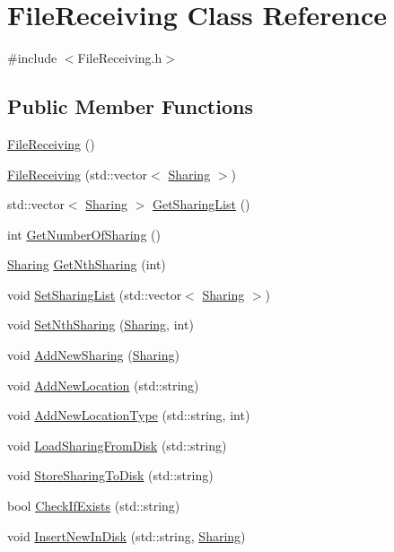 \hypertarget{classFileReceiving}{\section{File\-Receiving Class Reference}
\label{classFileReceiving}
}


{\ttfamily \#include $<$File\-Receiving.\-h$>$}

\subsection*{Public Member Functions}
\begin{DoxyCompactItemize}
\item 
\hyperlink{classFileReceiving_a210d62e5e2cb29bbd4b55127816f68bf}{File\-Receiving} ()
\item 
\hyperlink{classFileReceiving_a30c46d31d7e53fe7d83d9587265862a6}{File\-Receiving} (std\-::vector$<$ \hyperlink{structSharing}{Sharing} $>$)
\item 
std\-::vector$<$ \hyperlink{structSharing}{Sharing} $>$ \hyperlink{classFileReceiving_a42c374d04e33e3466abecd7d3c98f94a}{Get\-Sharing\-List} ()
\item 
int \hyperlink{classFileReceiving_a7b6fc52a5c35237ee26f6913f4a5eb23}{Get\-Number\-Of\-Sharing} ()
\item 
\hyperlink{structSharing}{Sharing} \hyperlink{classFileReceiving_a099259c6b07dcb917d1c334ac350998e}{Get\-Nth\-Sharing} (int)
\item 
void \hyperlink{classFileReceiving_a1d473ca13d04993d63bc6741a6fefbd1}{Set\-Sharing\-List} (std\-::vector$<$ \hyperlink{structSharing}{Sharing} $>$)
\item 
void \hyperlink{classFileReceiving_a86819116d557f8a5c3baec58eb7c6ef4}{Set\-Nth\-Sharing} (\hyperlink{structSharing}{Sharing}, int)
\item 
void \hyperlink{classFileReceiving_ad8c2893eb148ee850387c1fec54aa0bf}{Add\-New\-Sharing} (\hyperlink{structSharing}{Sharing})
\item 
void \hyperlink{classFileReceiving_af25c889e2f2c4638aa05fcbeb62da25a}{Add\-New\-Location} (std\-::string)
\item 
void \hyperlink{classFileReceiving_a8daeddf5b19c48abba79bc05f90d0bf8}{Add\-New\-Location\-Type} (std\-::string, int)
\item 
void \hyperlink{classFileReceiving_abe9f0ef10a71ba0e7f777e231123be5a}{Load\-Sharing\-From\-Disk} (std\-::string)
\item 
void \hyperlink{classFileReceiving_ab3d0b4ff93681251370b27c99ad5946a}{Store\-Sharing\-To\-Disk} (std\-::string)
\item 
bool \hyperlink{classFileReceiving_a6c0f67c0ce449c15eecc80153202bcd8}{Check\-If\-Exists} (std\-::string)
\item 
void \hyperlink{classFileReceiving_a9665aeb1d58fc74fe2d5e2314a5e6af5}{Insert\-New\-In\-Disk} (std\-::string, \hyperlink{structSharing}{Sharing})
\end{DoxyCompactItemize}

